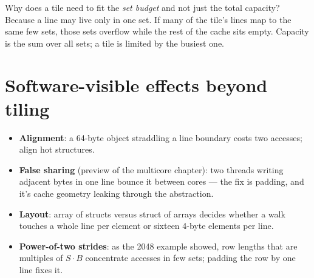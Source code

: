 \begin{checkpoint}
Why does a tile need to fit the \emph{set budget} and not just the
total capacity? Because a line may live only in one set. If many of the
tile's lines map to the same few sets, those sets overflow while the
rest of the cache sits empty. Capacity is the sum over all sets; a tile
is limited by the busiest one.
\end{checkpoint}

\section{Software-visible effects beyond tiling}
\label{sec:effects10}

\begin{itemize}
\item \textbf{Alignment}: a 64-byte object straddling a line
      boundary costs two accesses; align hot structures.
\item \textbf{False sharing} (preview of the multicore chapter):
      two threads writing adjacent bytes in one line bounce it
      between cores --- the fix is padding, and it's cache geometry
      leaking through the abstraction.
\item \textbf{Layout}: array of structs versus struct of arrays
      decides whether a walk touches a whole line per element or
      sixteen 4-byte elements per line.
\item \textbf{Power-of-two strides}: as the 2048 example showed,
      row lengths that are multiples of \(S\cdot B\) concentrate
      accesses in few sets; padding the row by one line fixes it.
\end{itemize}

